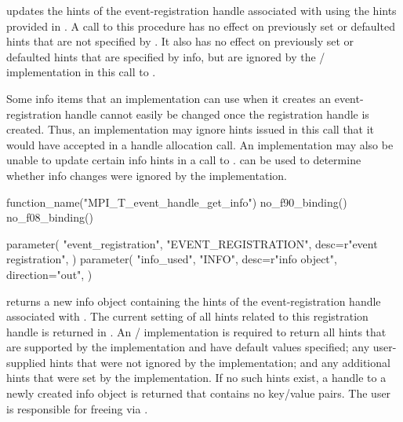  updates the hints of the
event-registration handle associated with  using the
hints provided in . A call to this procedure has no effect on previously
set or defaulted hints that are not specified by . It also has
no effect on previously set or defaulted hints that are specified by info,
but are ignored by the \MPI/ implementation in this call to
.


\begin{users}
    Some info items that an implementation can use when it creates an
    event-registration handle cannot easily be changed once the
    registration handle is created. Thus, an implementation may ignore
    hints issued in this call that it would have accepted in a handle
    allocation call. An implementation may also be unable to update certain
    info hints in a call to .
     can be used to determine
    whether info changes were ignored by the implementation.
\end{users}


\begin{mpi-binding}
    function_name("MPI_T_event_handle_get_info")
    no_f90_binding()
    no_f08_binding()

    parameter(
        "event_registration",
        "EVENT_REGISTRATION",
        desc=r"event registration",
    )
    parameter(
        "info_used",
        "INFO",
        desc=r"info object",
        direction="out",
    )
\end{mpi-binding}

 returns a new info object
containing the hints of the event-registration handle associated with
.  The current setting of all hints related to
this registration handle is returned in .  An \MPI/
implementation is required to return all hints that are supported by the
implementation and have default values specified; any user-supplied hints
that were not ignored by the implementation; and any additional hints that
were set by the implementation.  If no such hints exist, a handle to a
newly created info object is returned that contains no key/value pairs.
The user is responsible for freeing  via
.


